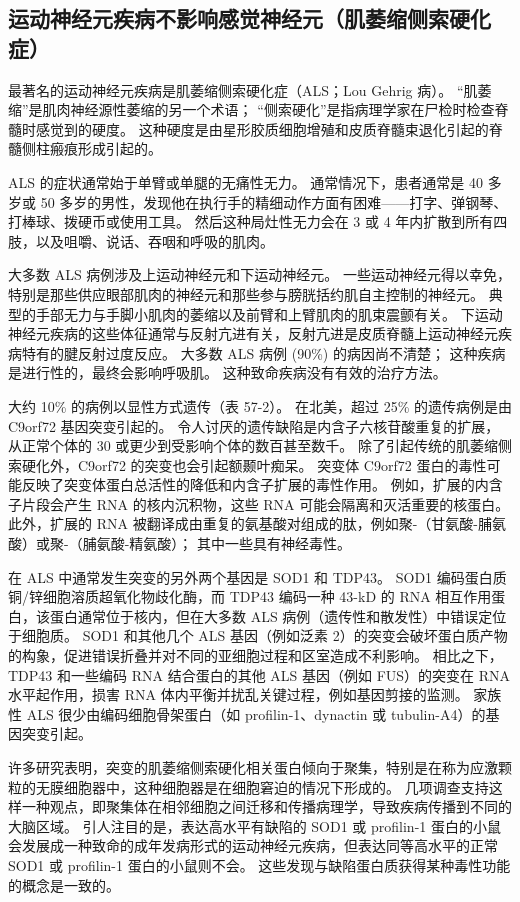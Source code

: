 \subsection{运动神经元疾病不影响感觉神经元（肌萎缩侧索硬化症）}
最著名的运动神经元疾病是肌萎缩侧索硬化症（ALS；Lou Gehrig 病）。 “肌萎缩”是肌肉神经源性萎缩的另一个术语； “侧索硬化”是指病理学家在尸检时检查脊髓时感觉到的硬度。 这种硬度是由星形胶质细胞增殖和皮质脊髓束退化引起的脊髓侧柱瘢痕形成引起的。

ALS 的症状通常始于单臂或单腿的无痛性无力。 通常情况下，患者通常是 40 多岁或 50 多岁的男性，发现他在执行手的精细动作方面有困难——打字、弹钢琴、打棒球、拨硬币或使用工具。 然后这种局灶性无力会在 3 或 4 年内扩散到所有四肢，以及咀嚼、说话、吞咽和呼吸的肌肉。

大多数 ALS 病例涉及上运动神经元和下运动神经元。 一些运动神经元得以幸免，特别是那些供应眼部肌肉的神经元和那些参与膀胱括约肌自主控制的神经元。 典型的手部无力与手脚小肌肉的萎缩以及前臂和上臂肌肉的肌束震颤有关。 下运动神经元疾病的这些体征通常与反射亢进有关，反射亢进是皮质脊髓上运动神经元疾病特有的腱反射过度反应。 大多数 ALS 病例 (90\%) 的病因尚不清楚； 这种疾病是进行性的，最终会影响呼吸肌。 这种致命疾病没有有效的治疗方法。

大约 10\% 的病例以显性方式遗传（表 57-2）。 在北美，超过 25\% 的遗传病例是由 C9orf72 基因突变引起的。 令人讨厌的遗传缺陷是内含子六核苷酸重复的扩展，从正常个体的 30 或更少到受影响个体的数百甚至数千。 除了引起传统的肌萎缩侧索硬化外，C9orf72 的突变也会引起额颞叶痴呆。 突变体 C9orf72 蛋白的毒性可能反映了突变体蛋白总活性的降低和内含子扩展的毒性作用。 例如，扩展的内含子片段会产生 RNA 的核内沉积物，这些 RNA 可能会隔离和灭活重要的核蛋白。 此外，扩展的 RNA 被翻译成由重复的氨基酸对组成的肽，例如聚-（甘氨酸-脯氨酸）或聚-（脯氨酸-精氨酸）； 其中一些具有神经毒性。

在 ALS 中通常发生突变的另外两个基因是 SOD1 和 TDP43。 SOD1 编码蛋白质铜/锌细胞溶质超氧化物歧化酶，而 TDP43 编码一种 43-kD 的 RNA 相互作用蛋白，该蛋白通常位于核内，但在大多数 ALS 病例（遗传性和散发性）中错误定位于细胞质。 SOD1 和其他几个 ALS 基因（例如泛素 2）的突变会破坏蛋白质产物的构象，促进错误折叠并对不同的亚细胞过程和区室造成不利影响。 相比之下，TDP43 和一些编码 RNA 结合蛋白的其他 ALS 基因（例如 FUS）的突变在 RNA 水平起作用，损害 RNA 体内平衡并扰乱关键过程，例如基因剪接的监测。 家族性 ALS 很少由编码细胞骨架蛋白（如 profilin-1、dynactin 或 tubulin-A4）的基因突变引起。

许多研究表明，突变的肌萎缩侧索硬化相关蛋白倾向于聚集，特别是在称为应激颗粒的无膜细胞器中，这种细胞器是在细胞窘迫的情况下形成的。 几项调查支持这样一种观点，即聚集体在相邻细胞之间迁移和传播病理学，导致疾病传播到不同的大脑区域。 引人注目的是，表达高水平有缺陷的 SOD1 或 profilin-1 蛋白的小鼠会发展成一种致命的成年发病形式的运动神经元疾病，但表达同等高水平的正常 SOD1 或 profilin-1 蛋白的小鼠则不会。 这些发现与缺陷蛋白质获得某种毒性功能的概念是一致的。


